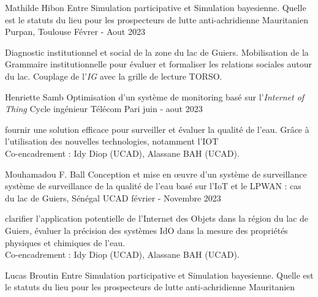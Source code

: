 \begin{cventries}
    \cventry
        {Mathilde Hibon} %
        {Entre Simulation participative et Simulation bayesienne. Quelle est le statuts du lieu pour les prospecteurs de lutte anti-achridienne Mauritanien} %
        {Purpan, Toulouse} %
        {Févrer - Aout 2023} %
        {
        \begin{cvitems} %
          Diagnostic institutionnel et social de la zone du lac de Guiers. Mobilisation de la Grammaire institutionnelle pour évaluer et formaliser les relations sociales autour du lac. Couplage de l'\textit{IG} avec la grille de lecture TORSO. 
        \end{cvitems}
        }
    \cventry
        {Henriette Samb} %
        {Optimisation d’un système de monitoring basé sur l’\textit{Internet of Thing}} %
        {Cycle ingénieur Télécom Pari } %
        {juin - aout 2023} %
        {
        \begin{cvitems} %
          fournir une solution efficace pour surveiller et évaluer la qualité de l’eau. Grâce à l’utilisation des nouvelles technologies, notamment l’IOT\\
            Co-encadrement : Idy Diop (UCAD), Alassane BAH (UCAD).
        \end{cvitems}
        }
    \cventry
        {Mouhamadou F. Ball} %
        {Conception et mise en œuvre d'un système de surveillance système de surveillance de la qualité de l'eau basé sur l'IoT et le LPWAN : cas du lac de Guiers, Sénégal} %
        {UCAD } %
        {février - Novembre 2023} %
        {
        \begin{cvitems} %
          clarifier l'application potentielle de l'Internet des Objets dans la région du lac de Guiers, évaluer la précision des systèmes IdO dans la mesure des propriétés physiques et chimiques de l'eau.\\
            Co-encadrement : Idy Diop (UCAD), Alassane BAH (UCAD).
        \end{cvitems}
        }
    \cventry
        {Lucas Broutin} %
        {Entre Simulation participative et Simulation bayesienne. Quelle est le statuts du lieu pour les prospecteurs de lutte anti-achridienne Mauritanien} %

\end{cventries}
